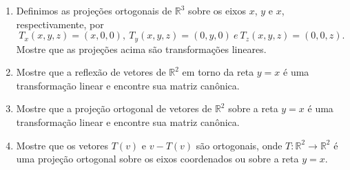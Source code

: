 \documentclass[a4paper,5pt]{amsbook}
\begin{document}
\begin{enumerate}
	\vspace{0.5cm}
	\item Definimos as proje\c{c}\~oes ortogonais de $\mathbb{R}^3$ sobre os eixos
		$x$, $y$ e $x$, respectivamente, por
		\[T_x(x,y,z) = (x,0,0),\ T_y(x,y,z) = (0,y,0)\ e\ T_z(x,y,z) =
			(0,0,z).\]
	Mostre que as proje\c{c}\~oes acima s\~ao transforma\c{c}\~oes lineares.

	\vspace{0.5cm}
	\item Mostre que a reflex\~ao de vetores de $\mathbb{R}^2$ em torno da
		reta $y=x$ \'e uma transforma\c{c}\~ao linear e encontre sua matriz can\^onica.

	\vspace{0.5cm}
	\item Mostre que a proje\c{c}\~ao ortogonal de vetores de $\mathbb{R}^2$ sobre a
		reta $y=x$ \'e uma transforma\c{c}\~ao linear e encontre sua matriz can\^onica.

	\vspace{0.5cm}
	\item Mostre que os vetores $T(v)$ e $v - T(v)$ s\~ao ortogonais, onde
		$T:\mathbb{R}^2 \rightarrow \mathbb{R}^2$ \'e uma proje\c{c}\~ao ortogonal
		sobre os eixos coordenados ou sobre a reta $y=x$.
\end{enumerate}
\end{document}
